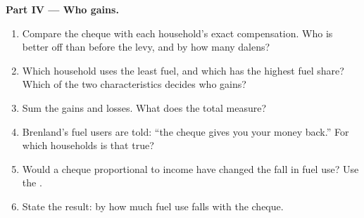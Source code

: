 \begin{problem}
\medskip\noindent\textbf{Part IV --- Who gains.}
\begin{enumerate}[resume]
  \item Compare the cheque with each household's exact compensation. Who is better off than before the levy, and by how many dalens?
  \item Which household uses the least fuel, and which has the highest fuel share? Which of the two characteristics decides who gains?
  \item Sum the gains and losses. What does the total measure?
  \item Brenland's fuel users are told: ``the cheque gives you your money back.'' For which households is that true?
  \item Would a cheque proportional to income have changed the fall in fuel use? Use the .
  \item State the result: by how much fuel use falls with the cheque.
\end{enumerate}
\end{problem}
